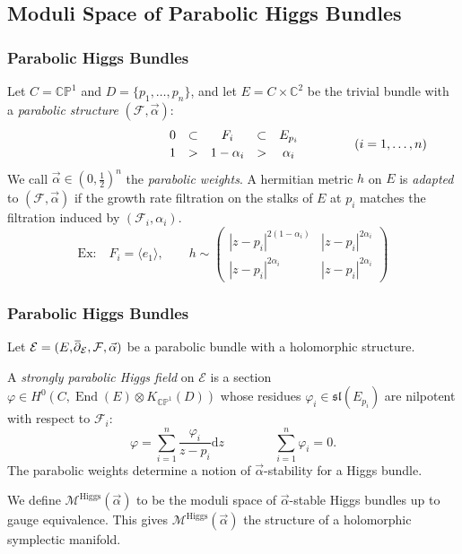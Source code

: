 \documentclass[aspectratio=1610,10pt]{beamer}
\theoremstyle{definition}
\theoremstyle{named}
\renewcommand{\bar}[1]{\overline{\hspace{-1pt}{#1}\hspace{-.2pt}}}
\newcommand{\de}{\text{d}}
\newcommand{\C}{\mathbb{C}}
\renewcommand{\P}{\mathbb{P}}
\DeclareMathOperator{\delbar}{\bar\partial}
\DeclareMathOperator{\End}{End}
\begin{document}
\subsection{Moduli Space of Parabolic Higgs Bundles}
\begin{frame}
    \frametitle{Parabolic Higgs Bundles}
    Let $C=\C\P^1$ and  $D=\{p_1,\dots,p_n\}$, and let $E=C\times\C^2$ be the trivial bundle with a \emph{parabolic structure} $(\mathcal F,\vec\alpha)$:
    $$
    \hspace{3.5cm}
    \begin{array}[column sep = -5pt]{ccccc}
        0   &\subset   &F_i             &\subset    &E_{p_i}\\[2pt]
        1   &>         &1-\alpha_i      &>          &\alpha_i
    \end{array}\qquad\qquad(i=1,\dots,n)
    $$
    We call $\vec\alpha\in(0,\frac12)^n$ the \emph{parabolic weights}.
    \vfill
    \pause
    A hermitian metric $h$ on $E$ is \emph{adapted} to $(\mathcal F,\vec\alpha)$ if the growth rate filtration on the stalks of $E$ at $p_i$ matches the filtration induced by $(\mathcal F_i,\alpha_i)$.
    $$\text{Ex:}\quad F_i=\langle e_1\rangle,\qquad h\sim\begin{pmatrix}|z-p_i|^{2(1-\alpha_i)}&|z-p_i|^{2\alpha_i}\\|z-p_i|^{2\alpha_i}&|z-p_i|^{2\alpha_i}\end{pmatrix}$$
\end{frame}

\begin{frame}
    \frametitle{Parabolic Higgs Bundles}
    Let $\mathcal E=(E,\delbar_\mathcal E,\mathcal F,\vec\alpha)$ be a parabolic bundle with a holomorphic structure.
    \vfill

    A \textit{strongly parabolic Higgs field} on $\mathcal E$ is a section $\varphi\in H^0(C,\End(E)\otimes K_{\C\P^1}(D))$ whose residues $\varphi_i\in\mathfrak{sl}(E_{p_i})$ are nilpotent with respect to $\mathcal F_i$:
        $$\varphi=\sum_{i=1}^n\frac{\varphi_i}{z-p_i}\de z\qquad\qquad\sum_{i=1}^n\varphi_i=0.$$
    \pause
    The parabolic weights determine a notion of $\vec\alpha$-stability for a Higgs bundle.
    \vfill

    We define $\mathcal M^\text{Higgs}(\vec\alpha)$ to be the moduli space of $\vec\alpha$-stable Higgs bundles up to gauge equivalence.  This gives $\mathcal M^\text{Higgs}(\vec\alpha)$ the structure of a holomorphic symplectic manifold.
    \vfill
\end{frame}
\end{document}
